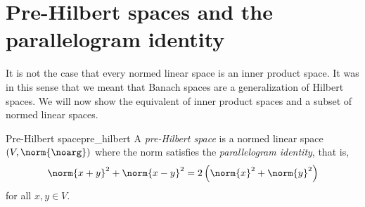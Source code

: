 \section{Pre-Hilbert spaces and the parallelogram identity}
It is not the case that every normed linear space is an inner product space. It was in this sense that we meant that Banach spaces are a generalization of Hilbert spaces. We will now show the equivalent of inner product spaces and a subset of normed linear spaces.
\begin{definition}{Pre-Hilbert space}{pre_hilbert}
    A \emph{pre-Hilbert space} is a normed linear space \((V, \norm{\noarg})\) where the norm satisfies the \emph{parallelogram identity}, that is,
    \begin{equation*}
        \norm{x + y}^2 + \norm{x - y}^2 = 2\left(\norm{x}^2 + \norm{y}^2\right)
    \end{equation*}
    for all \(x, y \in V\).
\end{definition}


